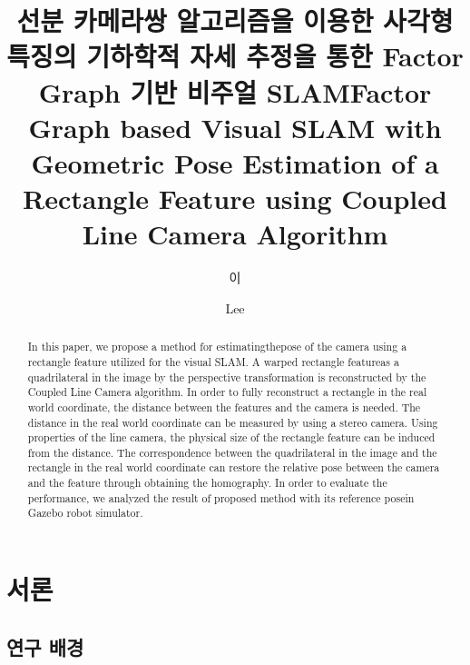 \documentclass[master,korean,final]{cbnu-ecs}
\title[korean]{선분 카메라쌍 알고리즘을 이용한 사각형 특징의 기하학적 자세 추정을 통한 Factor Graph 기반 비주얼 SLAM}
\title[english]{Factor Graph based Visual SLAM with Geometric Pose Estimation of a Rectangle Feature using Coupled Line Camera Algorithm}
\author[korean] {이}{재 민}
\author[english]{Lee}{Jae-Min}
\begin{document}
\tableofcontents
\listoffigures
\listoftables
\begin{abstract}
In this paper, we propose a method for estimatingthepose of the camera using a rectangle feature utilized for the  visual SLAM.  A warped rectangle featureas a quadrilateral in the image by the perspective transformation is reconstructed by the Coupled Line Camera algorithm. In order to fully reconstruct a rectangle in the real world coordinate, the distance between the features and the camera is needed. The distance in the real world coordinate can be measured by using a stereo camera. Using properties of the line camera, the physical size of the rectangle  feature can be induced from the distance. The correspondence between the quadrilateral in the image and the rectangle in the real world coordinate can restore the relative pose between the camera and the feature through obtaining the homography. In order to evaluate the performance, we analyzed the result of proposed method with its reference posein Gazebo robot simulator.
\end{abstract}



\chapter{서론}
\section{연구 배경}
\end{document}
